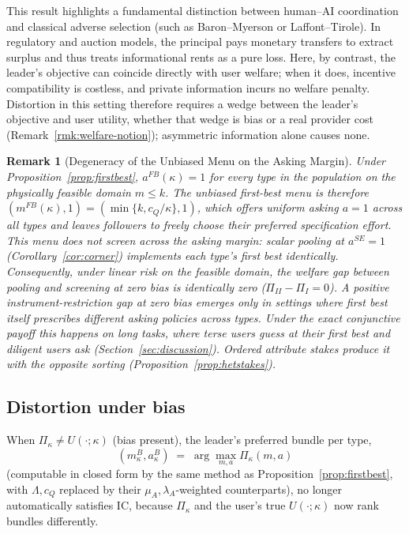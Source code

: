 \documentclass[11pt]{article}
\newtheorem{remark}{Remark}
\begin{document}
This result highlights a fundamental distinction between human--AI coordination and classical
adverse selection (such as Baron--Myerson or Laffont--Tirole). In regulatory and auction models,
the principal pays monetary transfers to extract surplus and thus treats informational rents as a pure loss.
Here, by contrast, the leader's objective can coincide directly with user welfare; when it does,
incentive compatibility is costless, and private information incurs no welfare penalty.
Distortion in this setting therefore requires a wedge between the leader's objective and user
utility, whether that wedge is bias or a real provider cost (Remark~\ref{rmk:welfare-notion});
asymmetric information alone causes none.

\begin{remark}[Degeneracy of the Unbiased Menu on the Asking Margin]
\label{rmk:unbiased_menu_degenerate}
Under Proposition~\ref{prop:firstbest}, $a^{FB}(\kappa) = 1$ for every type in the population on the physically feasible domain $m \le k$. The unbiased first-best menu is therefore $(m^{FB}(\kappa), 1) = (\min\{k, c_Q/\kappa\}, 1)$, which offers uniform asking $a=1$ across all types and leaves followers to freely choose their preferred specification effort. This menu does not screen across the asking margin: scalar pooling at $a^{SE} = 1$ (Corollary~\ref{cor:corner}) implements each type's first best identically. Consequently, under linear risk on the feasible domain, the welfare gap between pooling and screening at zero bias is identically zero ($\Pi_{II} - \Pi_I = 0$). A positive instrument-restriction gap at zero bias emerges only in settings where first best itself prescribes different asking policies across types. Under the exact conjunctive payoff this happens on long tasks, where terse users guess at their first best and diligent users ask (Section~\ref{sec:discussion}). Ordered attribute stakes produce it with the opposite sorting (Proposition~\ref{prop:hetstakes}).
\end{remark}

\subsection{Distortion under bias}

When $\Pi_\kappa \ne U(\cdot;\kappa)$ (bias present), the leader's preferred bundle per type,
\[
(m_\kappa^{B},a_\kappa^{B}) \;=\; \arg\max_{m,a}\Pi_\kappa(m,a)
\]
(computable in closed form by the same method as Proposition~\ref{prop:firstbest}, with
$\Lambda,c_Q$ replaced by their $\mu_A,\lambda_A$-weighted counterparts), no longer
automatically satisfies IC, because $\Pi_\kappa$ and the user's true $U(\cdot;\kappa)$
now rank bundles differently.
\end{document}
